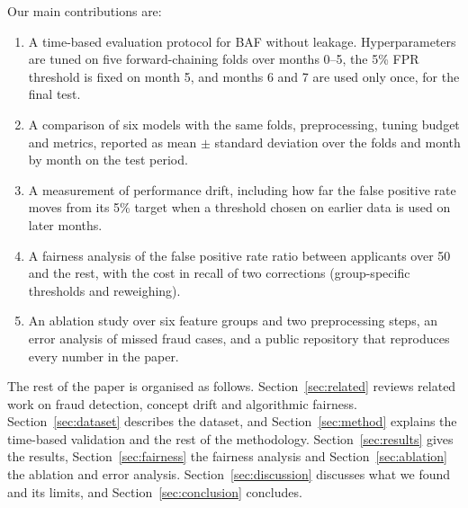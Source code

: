 Our main contributions are:
\begin{enumerate}
  \item A time-based evaluation protocol for BAF without leakage. Hyperparameters are tuned on five
        forward-chaining folds over months 0--5, the 5\% FPR threshold is fixed on month 5, and
        months 6 and 7 are used only once, for the final test.
  \item A comparison of six models with the same folds, preprocessing, tuning budget and metrics,
        reported as mean $\pm$ standard deviation over the folds and month by month on the test
        period.
  \item A measurement of performance drift, including how far the false positive rate moves from
        its 5\% target when a threshold chosen on earlier data is used on later months.
  \item A fairness analysis of the false positive rate ratio between applicants over 50 and the
        rest, with the cost in recall of two corrections (group-specific thresholds and reweighing).
  \item An ablation study over six feature groups and two preprocessing steps, an error analysis of
        missed fraud cases, and a public repository that reproduces every number in the paper.
\end{enumerate}

The rest of the paper is organised as follows. Section~\ref{sec:related} reviews related work on
fraud detection, concept drift and algorithmic fairness. Section~\ref{sec:dataset} describes the
dataset, and Section~\ref{sec:method} explains the time-based validation and the rest of the
methodology. Section~\ref{sec:results} gives the results, Section~\ref{sec:fairness} the fairness
analysis and Section~\ref{sec:ablation} the ablation and error analysis.
Section~\ref{sec:discussion} discusses what we found and its limits, and
Section~\ref{sec:conclusion} concludes.
